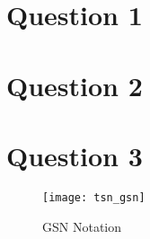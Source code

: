 \section{Question 1}





\section{Question 2}




\section{Question 3}




\begin{figure}[h]
\centering
\texttt{[image: tsn\_gsn]}
\caption{GSN Notation}
\end{figure}
